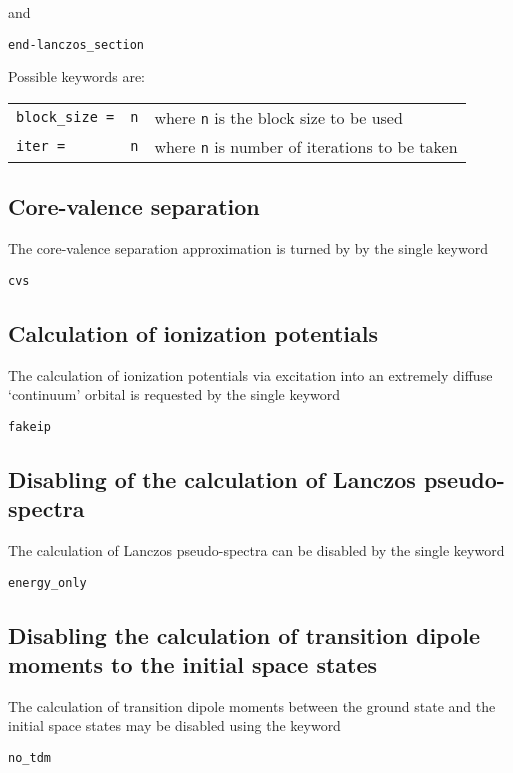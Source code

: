 \documentclass[12pt]{article}
\newcommand*\code[1]{\mbox{\texttt{{#1}}}} %
\begin{document}
\vspace{0.2cm}
\noindent
and

\vspace{0.2cm}
\code{end-lanczos\_section}

\vspace{0.2cm}
\noindent
Possible keywords are:

\begin{table}[h]
\vspace*{1.7ex}
\begin{center}
\begin{tabular}{llp{2.5in}}
\code{block\_size =} & \code{n} & where \code{n} is the block size to be used \\
\vspace{0.2cm}
\code{iter =} & \code{n} & where \code{n} is number of iterations to be taken \\
\end{tabular}
\end{center}
\end{table}

\subsection*{Core-valence separation}
\noindent
The core-valence separation approximation is turned by by the single
keyword 

\vspace{0.2cm}
\code{cvs}

\subsection*{Calculation of ionization potentials}
\noindent
The calculation of ionization potentials via excitation into an
extremely diffuse `continuum' orbital is requested by the single
keyword

\vspace{0.2cm}
\code{fakeip}

\subsection*{Disabling of the calculation of Lanczos pseudo-spectra}
\noindent
The calculation of Lanczos pseudo-spectra can be disabled by the
single keyword 

\vspace{0.2cm}
\code{energy\_only}

\subsection*{Disabling the calculation of transition dipole moments to
the initial space states}
\noindent
The calculation of transition dipole moments between the ground state
and the initial space states may be disabled using the keyword

\vspace{0.2cm}
\code{no\_tdm}
\end{document}
